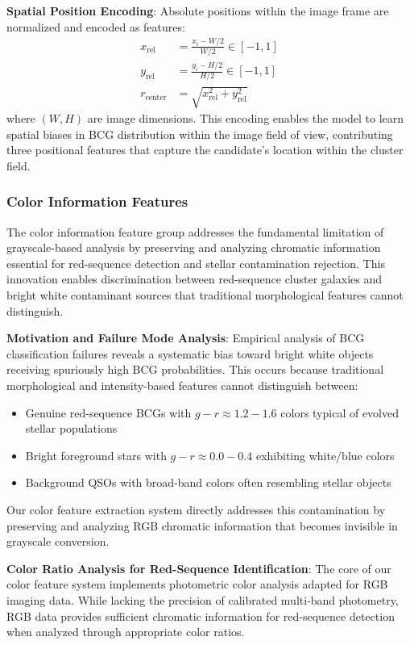 \documentclass[twocolumn,10pt]{aastex631}
\begin{document}
\textbf{Spatial Position Encoding}: Absolute positions within the image frame are normalized and encoded as features:
\begin{align}
x_{\text{rel}} &= \frac{x_i - W/2}{W/2} \in [-1, 1] \\
y_{\text{rel}} &= \frac{y_i - H/2}{H/2} \in [-1, 1] \\
r_{\text{center}} &= \sqrt{x_{\text{rel}}^2 + y_{\text{rel}}^2}
\end{align}
where $(W, H)$ are image dimensions. This encoding enables the model to learn spatial biases in BCG distribution within the image field of view, contributing three positional features that capture the candidate's location within the cluster field.

\subsubsection{Color Information Features}

The color information feature group addresses the fundamental limitation of grayscale-based analysis by preserving and analyzing chromatic information essential for red-sequence detection and stellar contamination rejection. This innovation enables discrimination between red-sequence cluster galaxies and bright white contaminant sources that traditional morphological features cannot distinguish.

\textbf{Motivation and Failure Mode Analysis}: Empirical analysis of BCG classification failures reveals a systematic bias toward bright white objects receiving spuriously high BCG probabilities. This occurs because traditional morphological and intensity-based features cannot distinguish between:
\begin{itemize}
\item Genuine red-sequence BCGs with $g-r \approx 1.2-1.6$ colors typical of evolved stellar populations \citep{Bell2004,Bruzual2003}
\item Bright foreground stars with $g-r \approx 0.0-0.4$ exhibiting white/blue colors
\item Background QSOs with broad-band colors often resembling stellar objects
\end{itemize}

Our color feature extraction system directly addresses this contamination by preserving and analyzing RGB chromatic information that becomes invisible in grayscale conversion.

\textbf{Color Ratio Analysis for Red-Sequence Identification}: The core of our color feature system implements photometric color analysis adapted for RGB imaging data. While lacking the precision of calibrated multi-band photometry, RGB data provides sufficient chromatic information for red-sequence detection when analyzed through appropriate color ratios.
\end{document}
